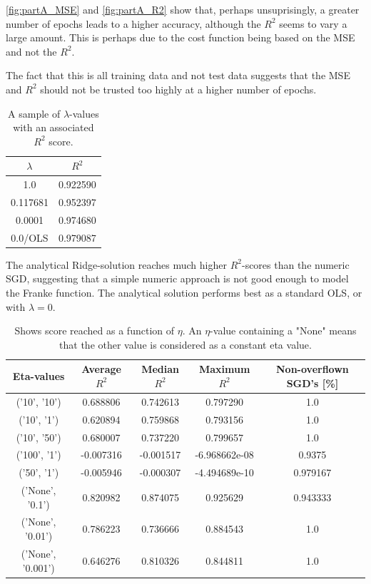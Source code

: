 \documentclass[a4paper, UKenglish]{article}
\newcommand{\0}{\mathbf{0}}
\newcommand{\1}{\mathbf{1}}
\begin{document}
\autoref{fig:partA_MSE} and \autoref{fig:partA_R2} show that, perhaps unsuprisingly, a greater number of epochs leads to a higher accuracy, although the $R^2$ seems to vary a large amount. This is perhaps due to the cost function being based on the MSE and not the $R^2$.

The fact that this is all training data and not test data suggests that the MSE and $R^2$ should not be trusted too highly at a higher number of epochs.



\begin{table}[H] 
\centering
\caption{A sample of $\lambda$-values with an associated $R^2$ score.}
\label{tab:Ridge performance}
\begin{tabular}{|c|c|}
  \hline
  $\lambda$ & $R^2$ \\
  \hline
  1.0 & 0.922590 \\
  0.117681 & 0.952397 \\
  0.0001 & 0.974680 \\
  0.0/OLS & 0.979087 \\
  \hline
\end{tabular}
\end{table}


The analytical Ridge-solution reaches much higher $R^2$-scores than the numeric SGD, suggesting that a simple numeric approach is not good enough to model the Franke function. The analytical solution performs best as a standard OLS, or with $\lambda = 0$.

\begin{table}[H] 
\centering
\caption{Shows score reached as a function of $\eta$. An $\eta$-value containing a "None" means that the other value is considered as a constant eta value.}
\label{tab:SGD eta-values}
\begin{tabular}{|c|c|c|c|c|}
	\hline
Eta-values & Average $R^2$ & Median $R^2$ & Maximum $R^2$ & Non-overflown SGD's [\%]\\
\hline
('10', '10')       & 0.688806 & 0.742613 & 0.797290 & 1.0 \\
('10', '1')        & 0.620894 & 0.759868 & 0.793156 & 1.0 \\
('10', '50')       & 0.680007 & 0.737220 & 0.799657 & 1.0 \\
('100', '1')       &-0.007316 &-0.001517 &-6.968662e-08 & 0.9375 \\
('50', '1')        &-0.005946 &-0.000307 &-4.494689e-10 & 0.979167 \\
('None', '0.1')    & 0.820982 & 0.874075 & 0.925629 & 0.943333 \\
('None', '0.01')   & 0.786223 & 0.736666 & 0.884543 & 1.0 \\
('None', '0.001')  & 0.646276 & 0.810326 & 0.844811 & 1.0 \\
	\hline
\end{tabular}
\end{table}
\end{document}
